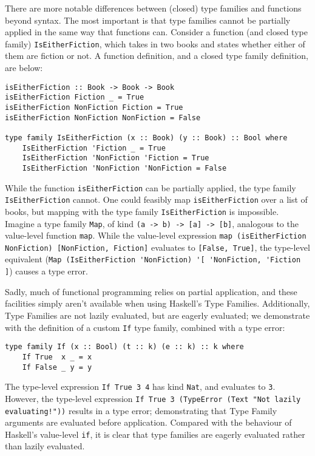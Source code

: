 \documentclass[12pt, a4paper, bibliography=totocnumbered]{scrreprt}
\newcommand{\inline}[1]{\lstinline[basicstyle=\ttfamily\footnotesize]{#1}}
\begin{document}
There are more notable differences between (closed) type families and functions beyond syntax. The most important is that type families cannot be partially applied in the same way that functions can. Consider a function (and closed type family) \inline{IsEitherFiction}, which takes in two books and states whether either of them are fiction or not. A function definition, and a closed type family definition, are below:

\begin{lstlisting}
isEitherFiction :: Book -> Book -> Book
isEitherFiction Fiction _ = True
isEitherFiction NonFiction Fiction = True
isEitherFiction NonFiction NonFiction = False

type family IsEitherFiction (x :: Book) (y :: Book) :: Bool where
    IsEitherFiction 'Fiction _ = True
    IsEitherFiction 'NonFiction 'Fiction = True
    IsEitherFiction 'NonFiction 'NonFiction = False
\end{lstlisting}

While the function \inline{isEitherFiction} can be partially applied, the type family \inline{IsEitherFiction} cannot. One could feasibly map \inline{isEitherFiction} over a list of books, but mapping with the type family \inline{IsEitherFiction} is impossible. Imagine a type family \inline{Map}, of kind \inline{(a -> b) -> [a] -> [b]}, analogous to the value-level function \inline{map}. While the value-level expression \inline{map (isEitherFiction NonFiction) [NonFiction, Fiction]} evaluates to \inline{[False, True]}, the type-level equivalent (\inline{Map (IsEitherFiction 'NonFiction) '[ 'NonFiction, 'Fiction ]}) causes a type error.

Sadly, much of functional programming relies on partial application, and these facilities simply aren't available when using Haskell's Type Families. Additionally, Type Families are not lazily evaluated, but are eagerly evaluated; we demonstrate with the definition of a custom \inline{If} type family, combined with a type error:

\begin{lstlisting}
type family If (x :: Bool) (t :: k) (e :: k) :: k where
    If True  x _ = x
    If False _ y = y
\end{lstlisting}

The type-level expression \inline{If True 3 4} has kind \inline{Nat}, and evaluates to \inline{3}. However, the type-level expression \inline{If True 3 (TypeError (Text "Not lazily evaluating!"))} results in a type error; demonstrating that Type Family arguments are evaluated before application. Compared with the behaviour of Haskell's value-level \inline{if}, it is clear that type families are eagerly evaluated rather than lazily evaluated.
\end{document}
